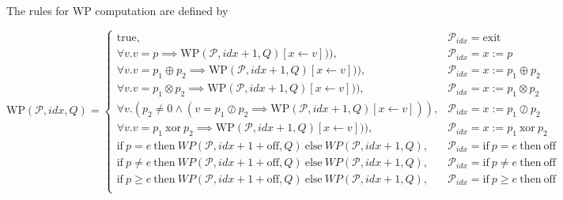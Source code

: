 The rules for WP computation are defined by


\[
  \mathrm{WP}(\mathcal{P}, idx, Q) =
  \begin{cases}
    \mathrm{true}, & \mathcal{P}_{idx} = \mathrm{exit} \\
    \forall v . v = p \implies \mathrm{WP}(\mathcal{P}, idx+1, Q)[x \leftarrow v])) , & \mathcal{P}_{idx} = x := p \\    
    \forall v . v = p_1 \oplus p_2 \implies \mathrm{WP}(\mathcal{P}, idx+1, Q)[x \leftarrow v])) , & \mathcal{P}_{idx} = x := p_1 \oplus p_2 \\
    \forall v . v = p_1 \otimes p_2 \implies \mathrm{WP}(\mathcal{P}, idx+1, Q)[x \leftarrow v])) , & \mathcal{P}_{idx} = x := p_1 \otimes p_2 \\    
    \forall v . (p_2  \neq 0 \land (v = p_1 \oslash p_2 \implies \mathrm{WP}(\mathcal{P}, idx+1, Q)[x \leftarrow v])) , & \mathcal{P}_{idx} = x := p_1 \oslash p_2 \\
    \forall v . v = p_1 ~ \mathrm{xor} ~ p_2 \implies \mathrm{WP}(\mathcal{P}, idx+1, Q)[x \leftarrow v])) , & \mathcal{P}_{idx} = x := p_1 ~ \mathrm{xor} ~ p_2 \\
    \mathrm{if} ~ p = e ~ \mathrm{then} ~ WP(\mathcal{P}, idx+1+\mathrm{off}, Q) ~ \mathrm{else} ~ WP(\mathcal{P},idx+1, Q) , & \mathcal{P}_{idx} = \mathrm{if} ~ p = e ~ \mathrm{then} ~ \mathrm{\mathrm{off}} \\
    \mathrm{if} ~ p \neq e ~ \mathrm{then} ~ WP(\mathcal{P}, idx+1+\mathrm{off}, Q) ~ \mathrm{else} ~ WP(\mathcal{P},idx+1, Q) , & \mathcal{P}_{idx} = \mathrm{if} ~ p \neq e ~ \mathrm{then} ~ \mathrm{\mathrm{off}} \\    
    \mathrm{if} ~ p \geq e ~ \mathrm{then} ~ WP(\mathcal{P}, idx+1+\mathrm{off}, Q) ~ \mathrm{else} ~ WP(\mathcal{P},idx+1, Q) , & \mathcal{P}_{idx} = \mathrm{if} ~ p \geq e ~ \mathrm{then} ~ \mathrm{\mathrm{off}} \\    \end{cases}
\]


